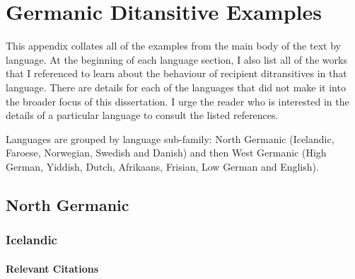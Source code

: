\chapter{Germanic Ditansitive Examples}
This appendix collates all of the examples from the main body of the text by language. At the beginning of each language section, I also list all of the works that I referenced to learn about the behaviour of recipient ditransitives in that language. There are details for each of the languages that did not make it into the broader focus of this dissertation. I urge the reader who is interested in the details of a particular language to consult the listed references.

Languages are grouped by language sub-family: North Germanic (Icelandic, Faroese, Norwegian, Swedish and Danish) and then West Germanic (High German, Yiddish, Dutch, Afrikaans, Frisian, Low German and English).

\section{North Germanic}
\subsection{Icelandic}
\subsubsection{Relevant Citations}
\cite{Haugen.1982,Zaenen.1985,Yip.1987,Falk.1990,Maling.1990,Rognvaldsson.1991,Ottosson.1991,Mrck.1992,Ottosson.1993,Kristoffersen.1994,Sprouse.1995,Holmberg.1995,Rognvaldsson.1996,Bardal.1997,Haugen.1998,Holmberg.1998,Maling.1998,Maling.2001,Holmberg.2002,Eythorsson.2005,Bardal.2000,Faarlund.2001,Bardal.2001,Bardal.2001b,Askedal.2001,Dehe.2004,Bardal.2006,Bardal.2007,Thrainsson.2007,Jonsson.2009b,Wallenberg.2011,Norris.2012,Eyorsson.2012,Sigursson.2012,Sigursson.2012b,Alexiadou.2013,Arnadottir.2013,Lundquist.2013,Lundquist.2013b,Alexiadou.2014}
